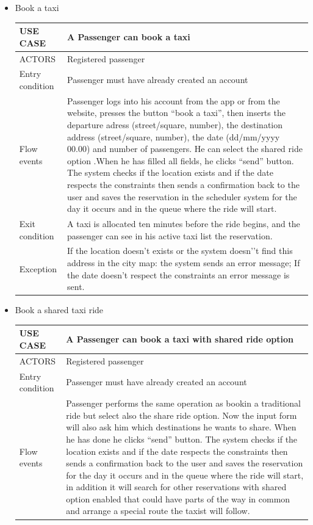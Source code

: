 \begin{itemize}
\begin{center}
\begin{figure} [h]
	\end{figure}
	\end{center}
	\newpage 
\item Book a taxi
	\begin{center}
   	 \begin{tabular}{ | l | p{11cm} |}
   	 \hline
   	USE CASE & A Passenger can book a taxi \\ \hline
   	 ACTORS & Registered passenger \\ \hline
    	 Entry condition & Passenger must have already created an account \\ \hline
    	 Flow events & Passenger logs into his account from the app or from the website, presses the button “book a taxi”, then inserts the departure adress (street/square, number), the destination address (street/square, number), the date (dd/mm/yyyy 00.00) and number of passengers. He can select the shared ride option .When he has filled all fields, he clicks “send” button. The system checks if the location exists and if the date respects the constraints then sends a confirmation back to the user and saves the reservation in the scheduler system for the day it occurs and in the queue where the ride will start.\\ \hline
  	   Exit condition & A taxi is allocated ten minutes before the ride begins, and the passenger can see in his active taxi list the reservation.\\ \hline
  	   Exception &  If the location doesn’t exists or the system doesn’’t find this address in the city map: the system sends an error message;
If the date doesn’t respect the constraints an error message is sent.\\ \hline
    \end{tabular}
\end{center}
\item Book a shared taxi ride
	\begin{center}
   	 \begin{tabular}{ | l | p{11cm} |}
   	 \hline
   	USE CASE & A Passenger can book a taxi with shared ride option\\ \hline
   	 ACTORS & Registered passenger \\ \hline
    	 Entry condition & Passenger must have already created an account \\ \hline
    	 Flow events & Passenger performs the same operation as bookin a traditional ride but select also the share ride option. Now the input form will also ask him which destinations he wants to share. When he has done he clicks “send” button. The system checks if the location exists and if the date respects the constraints then sends a confirmation back to the user and saves the reservation for the day it occurs and in the queue where the ride will start, in addition it will search for other reservations with shared option enabled that could have parts of the way in common and arrange a special route the taxist will follow.\\ \hline

\end{tabular}
\end{center}
\end{itemize}
